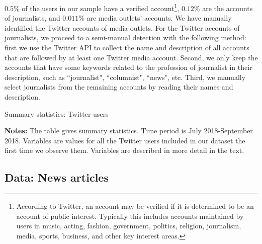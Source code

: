 $0.5\%$ of the users in our sample have a verified account\footnote{According to Twitter, an account may be verified if it is determined to be an account of public interest. Typically this includes accounts maintained by users in music, acting, fashion, government, politics, religion, journalism, media, sports, business, and other key interest areas.}, $0.12\%$ are the accounts of journalists, and $0.011\%$ are media outlets' accounts. We have manually identified the Twitter accounts of media outlets. For the Twitter accounts of journalists, we proceed to a semi-manual detection with the following method: first we use the Twitter API to collect the name and description of all accounts that are followed by at least one Twitter media account. Second, we only keep the accounts that have some keywords related to the profession of journalist in their description, such as ``journalist", ``columnist", ``news", etc. Third, we manually select journalists from the remaining accounts by reading their names and description.



\begin{table}
\caption{Summary statistics: Twitter users}
\begin{center}
	
\end{center}
\begin{spacing}{0.5}
	{\fns \textbf{Notes:} The table gives summary statistics. Time period is July 2018-September 2018. Variables are values for all the Twitter users included in our dataset the first time we observe them. Variables are described in more detail in the text.} 
\end{spacing}
\label{Tab:table_summary_users_all_first}
\end{table} 



\subsection{Data: News articles\label{Sec:DataNews}}


